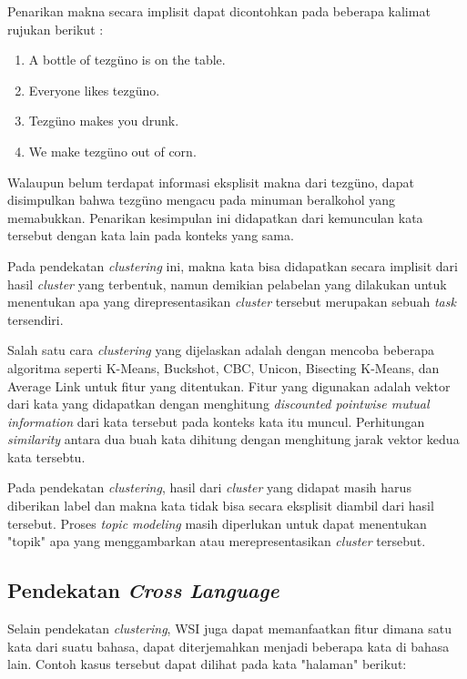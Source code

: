 	Penarikan makna secara implisit dapat dicontohkan pada beberapa kalimat rujukan berikut \citep{denkowski2009survey}:
	
	\begin{enumerate}
		\item A bottle of tezg\"{u}no is on the table.
		\item Everyone likes tezg\"{u}no.
		\item Tezg\"{u}no makes you drunk.
		\item We make tezg\"{u}no out of corn.
	\end{enumerate}
	
	Walaupun belum terdapat informasi eksplisit makna dari tezg\"{u}no, dapat disimpulkan bahwa tezg\"{u}no mengacu pada minuman beralkohol yang memabukkan. Penarikan kesimpulan ini didapatkan dari kemunculan kata tersebut dengan kata lain pada konteks yang sama.
	
	Pada pendekatan \textit{clustering} ini, makna kata bisa didapatkan secara implisit dari hasil \textit{cluster} yang terbentuk, namun demikian pelabelan yang dilakukan untuk menentukan apa yang direpresentasikan \textit{cluster} tersebut merupakan sebuah \textit{task} tersendiri.
	
	Salah satu cara \textit{clustering} yang dijelaskan \citep{pantel2002discovering} adalah dengan mencoba beberapa algoritma seperti K-Means, Buckshot, CBC, Unicon, Bisecting K-Means, dan Average Link untuk fitur yang ditentukan. Fitur yang digunakan adalah vektor dari kata yang didapatkan dengan menghitung \textit{discounted pointwise mutual information} dari kata tersebut pada konteks kata itu muncul. Perhitungan \textit{similarity} antara dua buah kata dihitung dengan menghitung jarak vektor kedua kata tersebtu.
	
	Pada pendekatan \textit{clustering}, hasil dari \textit{cluster} yang didapat masih harus diberikan label dan makna kata tidak bisa secara eksplisit diambil dari hasil tersebut. Proses \textit{topic modeling} masih diperlukan untuk dapat menentukan "topik" apa yang menggambarkan atau merepresentasikan \textit{cluster} tersebut. 
	
	\subsection{Pendekatan \textit{Cross Language}}
	Selain pendekatan \textit{clustering}, WSI juga dapat memanfaatkan fitur dimana satu kata dari suatu bahasa, dapat diterjemahkan menjadi beberapa kata di bahasa lain. Contoh kasus tersebut dapat dilihat pada kata "halaman" berikut:

